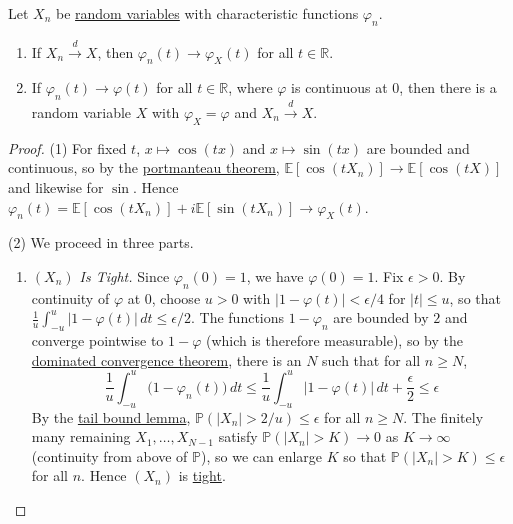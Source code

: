 	\begin{theorem}
	  \label{thm:levy-continuity-theorem}
		Let $X_n$ be \hyperref[def:random-variable]{random variables} with characteristic functions $\varphi_n$. 
		\begin{enumerate}
			\item If $X_n \xrightarrow{d} X$, then $\varphi_n (t) \to \varphi_X (t)$ for all $t \in \mathbb{R}$. 
			\item If $\varphi_n (t) \to \varphi(t)$ for all $t \in \mathbb{R}$, where $\varphi$ is continuous at $0$, then there is a random variable $X$ with $\varphi_X = \varphi$ and $X_n \xrightarrow{d} X$. 
		\end{enumerate}
	\end{theorem}
	\begin{proof}
		(1) For fixed $t$, $x \mapsto \cos(t x)$ and $x \mapsto \sin(t x)$ are bounded and continuous, so by the \hyperref[thm:portmanteau-theorem]{portmanteau theorem}, $\mathbb{E}[\cos(t X_n)] \to \mathbb{E}[\cos(t X)]$ and likewise for $\sin$. Hence $\varphi_n (t) = \mathbb{E}[\cos(t X_n)] + i \mathbb{E}[\sin(t X_n)] \to \varphi_X (t)$. 

		(2) We proceed in three parts. 

		\begin{enumerate}
		\item \textit{$(X_n)$ Is Tight.} Since $\varphi_n (0) = 1$, we have $\varphi(0) = 1$. Fix $\epsilon > 0$. By continuity of $\varphi$ at $0$, choose $u > 0$ with $|1 - \varphi(t)| < \epsilon / 4$ for $|t| \leq u$, so that $\frac{1}{u} \int_{-u}^u |1 - \varphi(t)| \,dt \leq \epsilon / 2$. The functions $1 - \varphi_n$ are bounded by $2$ and converge pointwise to $1 - \varphi$ (which is therefore measurable), so by the \hyperref[mt-thm:dominated-convergence-theorem]{dominated convergence theorem}, there is an $N$ such that for all $n \geq N$, 
		\begin{equation}
			\frac{1}{u} \int_{-u}^u \big( 1 - \varphi_n (t) \big) \,dt \leq \frac{1}{u} \int_{-u}^u |1 - \varphi(t)| \,dt + \frac{\epsilon}{2} \leq \epsilon
		\end{equation}
		By the \hyperref[thm:tail-bound-via-cf]{tail bound lemma}, $\mathbb{P}(|X_n| > 2/u) \leq \epsilon$ for all $n \geq N$. The finitely many remaining $X_1, \ldots, X_{N-1}$ satisfy $\mathbb{P}(|X_n| > K) \to 0$ as $K \to \infty$ (continuity from above of $\mathbb{P}$), so we can enlarge $K$ so that $\mathbb{P}(|X_n| > K) \leq \epsilon$ for all $n$. Hence $(X_n)$ is \hyperref[def:tight-sequence-of-random-variables]{tight}. 


\end{enumerate}
\end{proof}

